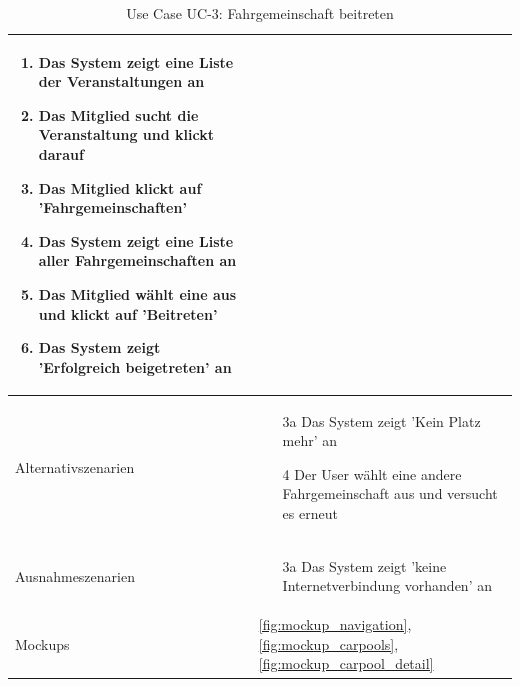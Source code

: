 \begin{table}[ht]
\begin{tabular}{ l | p{10cm} }
\begin{enumerate}
					\item Das System zeigt eine Liste der Veranstaltungen an
					\item Das Mitglied sucht die Veranstaltung und klickt darauf
					\item Das Mitglied klickt auf 'Fahrgemeinschaften'
					\item Das System zeigt eine Liste aller Fahrgemeinschaften an
					\item Das Mitglied wählt eine aus und klickt auf 'Beitreten'
					\item Das System zeigt 'Erfolgreich beigetreten' an
					\end{enumerate}
					\\ \hline
	Alternativszenarien	&	\begin{enumerate}
					\item[3a] Das System zeigt 'Kein Platz mehr' an
					\item[4] Der User wählt eine andere Fahrgemeinschaft aus und versucht es erneut
					\end{enumerate}
					\\ \hline
	Ausnahmeszenarien&	\begin{enumerate}
					\item[3a] Das System zeigt 'keine Internetverbindung vorhanden' an
					\end{enumerate}
					\\ \hline
	Mockups	 	&	\ref{fig:mockup_navigation}, \ref{fig:mockup_carpools}, \ref{fig:mockup_carpool_detail}
  \end{tabular}
   \caption{Use Case UC-3: Fahrgemeinschaft beitreten}\label{table:use_case_3}
\end{table}

